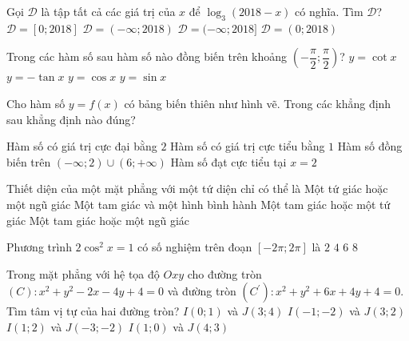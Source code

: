 \begin{ex}%
Gọi $\mathscr{D}$ là tập tất cả các giá trị của $x$ để $\log_3(2018-x)$ có nghĩa. Tìm $\mathscr{D}$?
\choice
{$\mathscr{D}=[0; 2018]$}
{\True $\mathscr{D}=(-\infty; 2018)$}
{$\mathscr{D}=(-\infty; 2018]$}
{$\mathscr{D}=(0; 2018)$}
\end{ex}

\begin{ex}%
Trong các hàm số sau hàm số nào đồng biến trên khoảng $\left(-\dfrac{\pi}{2}; \dfrac{\pi}{2}\right)$?
\choice
{$y=\cot x$}
{$y=-\tan x$}
{$y=\cos x$}
{\True $y=\sin x$}
\end{ex}

\begin{ex}%
Cho hàm số $y=f(x)$ có bảng biến thiên như hình vẽ. Trong các khẳng định sau khẳng định nào đúng?
\begin{center}
\end{center}
\choice
{Hàm số có giá trị cực đại bằng $2$}
{\True Hàm số có giá trị cực tiểu bằng $1$}
{Hàm số đồng biến trên $(-\infty; 2) \cup (6; +\infty)$}
{Hàm số đạt cực tiểu tại $x=2$}
\end{ex}

\begin{ex}%
Thiết diện của một mặt phẳng với một tứ diện chỉ có thể là
\choice
{Một tứ giác hoặc một ngũ giác}
{Một tam giác và một hình bình hành}
{\True Một tam giác hoặc một tứ giác}
{Một tam giác hoặc một ngũ giác}
\end{ex}

\begin{ex}%
Phương trình $2{\cos}^2x=1$ có số nghiệm trên đoạn $[-2\pi; 2\pi]$ là
\choice
{$2$}
{$4$}
{$6$}
{\True $8$}
\end{ex}

\begin{ex}%
Trong mặt phẳng với hệ tọa độ $Oxy$ cho đường tròn $(C): x^2+y^2-2x-4y+4=0$ và đường tròn $(C^\prime): x^2+y^2+6x+4y+4=0$. Tìm tâm vị tự của hai đường tròn?
\choice
{\True $I(0;1)$ và $J(3;4)$}
{$I(-1;-2)$ và $J(3;2)$}
{$I(1;2)$ và $J(-3;-2)$}
{$I(1;0)$ và $J(4;3)$}
\end{ex}

